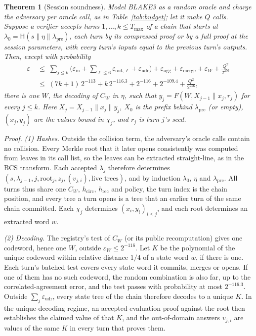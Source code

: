 \documentclass[11pt]{article}
\newtheorem{theorem}{Theorem}
\begin{document}
\begin{theorem}[Session soundness]
\label{thm:session}
Model BLAKE3 as a random oracle and charge the adversary per oracle call, as in Table~\ref{tab:budget}; let it make \(Q\) calls.
Suppose a verifier accepts turns \(1, \ldots, k \le T_{\max}\) of a chain that starts at \(\lambda_0 = \mathsf{H}(s \| \eta \| \lambda_{\mathrm{pre}})\), each turn by its compressed proof or by a full proof at the session parameters, with every turn's inputs equal to the previous turn's outputs.
Then, except with probability
\begin{align*}
\varepsilon &\;\le\; \sum_{j \le k} \Big(\varepsilon_{\mathrm{in}} + \sum_{\ell \le 6} \varepsilon_{\mathrm{out},\ell} + \varepsilon_{\mathrm{udr}}\Big) + \varepsilon_{\mathrm{agg}} + \varepsilon_{\mathrm{merge}} + \varepsilon_{W} + \frac{Q^2}{2^{256}}\\
&\;\le\; (7k+1)\,2^{-113} + k\,2^{-116.3} + 2^{-116} + 2^{-109.4} + \frac{Q^2}{2^{256}},
\end{align*}
there is one \(W\), the decoding of \(C_W\) in \(\eta\), such that \(y_j = F(W, X_{j-1} \| x_j, r_j)\) for every \(j \le k\).
Here \(X_j = X_{j-1} \| x_j \| y_j\), \(X_0\) is the prefix behind \(\lambda_{\mathrm{pre}}\) (or empty), \((x_j, y_j)\) are the values bound in \(\chi_j\), and \(r_j\) is turn \(j\)'s seed.
\end{theorem}

\noindent\emph{Proof.}
\emph{(1) Hashes.} Outside the collision term, the adversary's oracle calls contain no collision.
Every Merkle root that it later opens consistently was computed from leaves in its call list, so the leaves can be extracted straight-line, as in the BCS transform.
Each accepted \(\lambda_j\) therefore determines \((s, \lambda_{j-1}, j, \mathrm{root}_j, z_j, (v_{j,i}), \text{live trees})\), and by induction \(\lambda_0\), \(\eta\) and \(\lambda_{\mathrm{pre}}\).
All turns thus share one \(C_W\), \(h_{\mathrm{circ}}\), \(h_{\mathrm{rec}}\) and policy, the turn index is the chain position, and every tree a turn opens is a tree that an earlier turn of the same chain committed.
Each \(\chi_j\) determines \((x_i, y_i)_{i \le j}\), and each root determines an extracted word \(w\).

\emph{(2) Decoding.} The registry's test of \(C_W\) (or its public recomputation) gives one codeword, hence one \(W\), outside \(\varepsilon_W \le 2^{-116}\).
Let \(K\) be the polynomial of the unique codeword within relative distance \(1/4\) of a state word \(w\), if there is one.
Each turn's batched test covers every state word it commits, merges or opens.
If one of them has no such codeword, the random combination is also far, up to the correlated-agreement error, and the test passes with probability at most \(2^{-116.3}\).
Outside \(\sum_j \varepsilon_{\mathrm{udr}}\), every state tree of the chain therefore decodes to a unique \(K\).
In the unique-decoding regime, an accepted evaluation proof against the root then establishes the claimed value of that \(K\), and the out-of-domain answers \(v_{j,i}\) are values of the same \(K\) in every turn that proves them.
\end{document}
